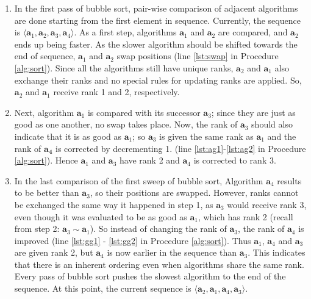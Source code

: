\documentclass[conference]{IEEEtran}
\begin{document}
\begin{enumerate}
	\item 
          In the first pass of bubble sort, pair-wise comparison of adjacent algorithms are done starting from the first
          element in sequence. Currently, the sequence is $\langle \mathbf{a}_1, \mathbf{a}_2, \mathbf{a}_3, \mathbf{a}_4 \rangle$.
          As a first step, algorithms $\mathbf{a}_1$ and $\mathbf{a}_2$ are compared, and 
          $\mathbf{a}_2$ ends up being faster. As the slower algorithm should be shifted towards the end of sequence, $\mathbf{a}_1$ and $\mathbf{a}_2$ swap positions  (line \ref{lst:swap} in
          Procedure \ref{alg:sort}). Since all the algorithms still have unique ranks, $\mathbf{a}_2$ and
          $\mathbf{a}_1$ also exchange their ranks and no special rules for updating ranks are applied.
          So, $\mathbf{a}_2$ and $\mathbf{a}_1$ receive rank 1 and 2, respectively.
	
	\item Next, algorithm $\mathbf{a}_1$ is compared with its successor $\mathbf{a}_3$;
          since they are just as good as one another, 
          no swap takes place. Now, the rank of $\mathbf{a}_3$ should also indicate that it is as good as $\mathbf{a}_1$;
          so $\mathbf{a}_3$ is given the same rank as $\mathbf{a}_1$ 
            and the rank of $\mathbf{a_4}$ is corrected by
         decrementing 1. (line \ref{lst:ag1}-\ref{lst:ag2} in Procedure \ref{alg:sort}). Hence $\mathbf{a}_1$ and $\mathbf{a}_3$ have rank 2 and $\mathbf{a}_4$ is corrected to rank 3.
	
       \item
         In the last comparison of the first sweep of bubble sort, Algorithm $\mathbf{a}_4$ results to be better than $\mathbf{a}_3$, so their positions are
          swapped. However, ranks cannot be exchanged the same way it happened in step 1,
          as $\mathbf{a}_3$ would receive rank 3, even though it was evaluated to be
          as good as $\mathbf{a}_1$, which has rank 2 (recall from step 2: $\mathbf{a}_3 \sim \mathbf{a}_1$). So
          instead of changing the rank of $\mathbf{a}_3$, the rank of $\mathbf{a}_4$ is improved (line \ref{lst:gg1} -
          \ref{lst:gg2} in Procedure \ref{alg:sort}). Thus  $\mathbf{a}_1$,  $\mathbf{a}_4$ and  $\mathbf{a}_3$ are
          given rank 2, but $\mathbf{a}_4$ is now earlier in the sequence than $\mathbf{a}_3$. This indicates that there
          is an inherent ordering even when algorithms share the same rank.
          Every pass of bubble sort pushes the slowest algorithm to the end of the sequence.
          At this point, the current sequence is $\langle \mathbf{a}_2, \mathbf{a}_1, \mathbf{a}_4, \mathbf{a}_3 \rangle$.
		

\end{enumerate}
\end{document}
